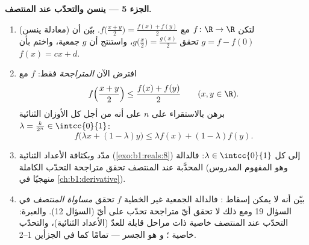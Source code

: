 \begin{problem}[{مسألة نهاية الأسبوع --- $f(x + y) = f(x) + f(y)$:
الانتظام يفرض الخطية، وصورة الوحوش}]
\medskip
\noindent\textbf{الجزء 5 --- ينسن والتحدّب عند المنتصف.}
\begin{enumerate}[resume]
  \item (معادلة ينسن) لتكن $f \colon \R \to \R$
         مع $f\bigl(\frac{x+y}{2}\bigr) = \frac{f(x)
        + f(y)}{2}$. بيّن أن $g = f - f(0)$ تحقق
        $g\bigl(\frac x2\bigr) = \frac{g(x)}{2}$، واستنتج أن
        $g$ جمعية، واختم بأن $f(x) = cx + d$.
  \item افترض الآن \emph{المتراجحة} فقط: $f$ 
        مع
        \[
        f\Bigl(\frac{x + y}{2}\Bigr) \leq \frac{f(x) +
        f(y)}{2} \qquad (x, y \in \R).
        \]
        برهن بالاستقراء على $n$ على أنه من أجل كل الأوزان الثنائية
        $\lambda = \frac{k}{2^n} \in \intcc{0}{1}$:
        \[
        f\bigl(\lambda x + (1 - \lambda)y\bigr) \leq \lambda
        f(x) + (1 - \lambda) f(y) .
        \]
  \item مدّد  وبكثافة الأعداد الثنائية
        (\cref{exo:b1:reals:8}) إلى كل $\lambda \in
        \intcc{0}{1}$: فالدالة  المحدَّبة عند المنتصف
        تحقق متراجحة التحدّب الكاملة (وهو المفهوم
        المدروس منهجيًا في \cref{ch:b1:derivative}).
  \item بيّن أنه لا يمكن إسقاط : فالدالة الجمعية
        غير الخطية $f$ تحقق \emph{مساواة المنتصف} في السؤال
        19 ومع ذلك لا تحقق أيّ متراجحة تحدّب على أيّ  (السؤال
        12). والعبرة: التحدّب عند المنتصف خاصية ذات مراحل
        قابلة للعدّ (الأعداد الثنائية)، والتحدّب خاصية ؛ و
         هو الجسر --- تمامًا كما في الجزأين 1--2.
\end{enumerate}


\end{problem}
